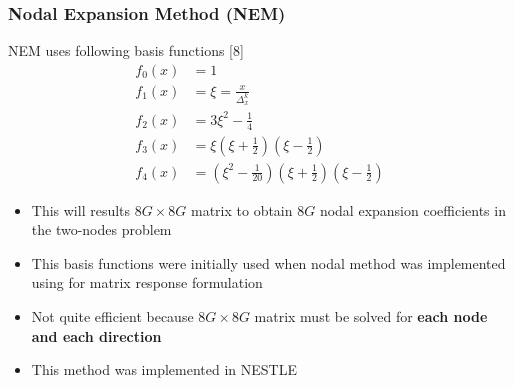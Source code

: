 \documentclass{beamer}
\begin{document}

\begin{frame}
\frametitle{Nodal Expansion Method (NEM)}
\begin{block}{NEM uses following basis functions [8]}
    \begin{align*}
        \scriptscriptstyle {f_0}(x) &{\scriptscriptstyle =} \scriptscriptstyle 1\\
        \scriptscriptstyle {f_1}(x) &{\scriptscriptstyle =} \scriptscriptstyle \xi  = \frac{x}{{\Delta _x^k}}\\
        \scriptscriptstyle {f_2}(x) &{\scriptscriptstyle =} \scriptscriptstyle 3{\xi^2} - \frac{1}{4}\\
        \scriptscriptstyle {f_3}(x) &{\scriptscriptstyle =} \scriptscriptstyle \xi \left( {\xi  + \frac{1}{2}} \right)\left( {\xi  - \frac{1}{2}} \right)\\
        \scriptscriptstyle {f_4}(x) &{\scriptscriptstyle =} \scriptscriptstyle \left( {{\xi^2} - \frac{1}{{20}}} \right)\left( {\xi  + \frac{1}{2}} \right)\left( {\xi  - \frac{1}{2}} \right)
    \end{align*}
\end{block}
\begin{itemize}
\item This will results $8G\times8G$ matrix to obtain $8G$ nodal expansion coefficients in the two-nodes problem
\item This basis functions were initially used when nodal method was implemented using for matrix response formulation
\item Not quite efficient because $8G\times8G$ matrix must be solved for \textbf{each node and each direction}
\item This method was implemented in NESTLE
\end{itemize}
\end{frame}

\end{document}
